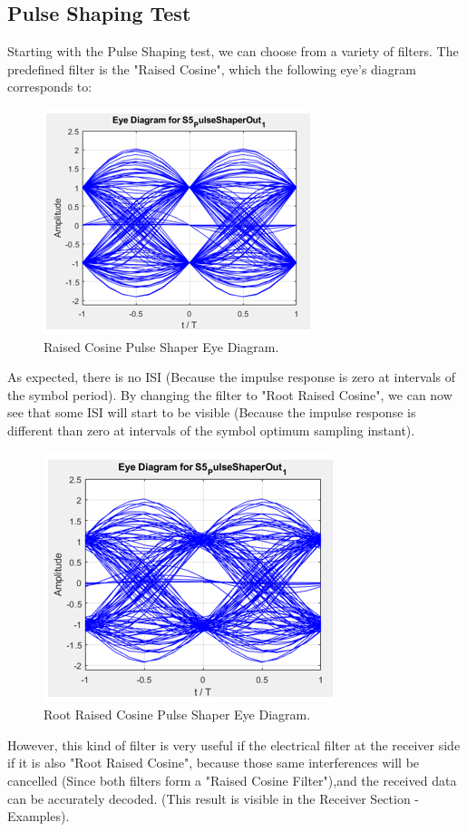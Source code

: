 \subsection*{Pulse Shaping Test}
Starting with the Pulse Shaping test, we can choose from a variety of filters. The predefined filter is the "Raised Cosine", which the following eye's diagram corresponds to:
\begin{figure}[H]
	\centering
	\includegraphics[scale=0.75]{./lib/m_qam_transmitter/figures/raised_01}
	\caption{ Raised Cosine Pulse Shaper Eye Diagram.}\label{raised_01}
\end{figure}
As expected, there is no ISI (Because the impulse response is zero at intervals of the symbol period). By changing the filter to "Root Raised Cosine", we can now see that some ISI will start to be visible (Because the impulse response is different than zero at intervals of the symbol optimum sampling instant).
\begin{figure}[H]
	\centering
	\includegraphics[scale=0.75]{./lib/m_qam_transmitter/figures/rootraised_01}
	\caption{Root Raised Cosine Pulse Shaper Eye Diagram.}\label{rootraised_01}
\end{figure}
However, this kind of filter is very useful if the electrical filter at the receiver side if it is also "Root Raised Cosine", because those same interferences will be cancelled (Since both filters form a "Raised Cosine Filter"),and the received data can be accurately decoded. (This result is visible in the Receiver Section -Examples).\\
